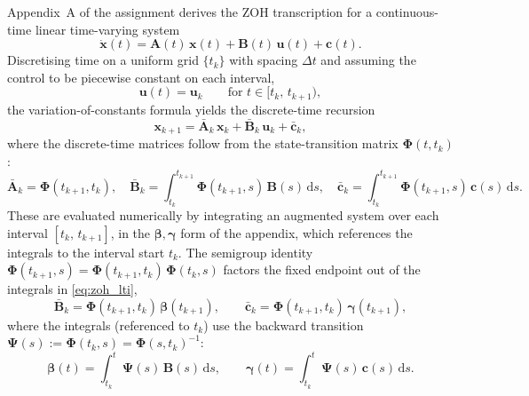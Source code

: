 \documentclass[../main.tex]{subfiles}
\begin{document}
Appendix~A of the assignment derives the ZOH transcription for a continuous-time linear time-varying system
\begin{equation}
    \dot{\mathbf{x}}(t) = \mathbf{A}(t)\,\mathbf{x}(t) + \mathbf{B}(t)\,\mathbf{u}(t) + \mathbf{c}(t).
    \label{eq:ltv_sys}
\end{equation}
Discretising time on a uniform grid $\{t_k\}$ with spacing $\Delta t$ and assuming the control to be piecewise constant on each interval,
\begin{equation}
    \mathbf{u}(t) = \mathbf{u}_k \qquad \text{for } t \in [t_k,\, t_{k+1}),
\end{equation}
the variation-of-constants formula yields the discrete-time recursion
\begin{equation}
    \mathbf{x}_{k+1} = \bar{\mathbf{A}}_k\,\mathbf{x}_k + \bar{\mathbf{B}}_k\,\mathbf{u}_k + \bar{\mathbf{c}}_k,
    \label{eq:zoh_lti}
\end{equation}
where the discrete-time matrices follow from the state-transition matrix $\boldsymbol{\Phi}(t,t_k)$:
\begin{equation}
    \bar{\mathbf{A}}_k = \boldsymbol{\Phi}(t_{k+1},t_k),\quad
    \bar{\mathbf{B}}_k = \int_{t_k}^{t_{k+1}}\!\boldsymbol{\Phi}(t_{k+1},s)\,\mathbf{B}(s)\,\mathrm{d}s,\quad
    \bar{\mathbf{c}}_k = \int_{t_k}^{t_{k+1}}\!\boldsymbol{\Phi}(t_{k+1},s)\,\mathbf{c}(s)\,\mathrm{d}s.
\end{equation}
These are evaluated numerically by integrating an augmented system over each interval $[t_k,\,t_{k+1}]$, in the $\boldsymbol{\beta},\boldsymbol{\gamma}$ form of the appendix, which references the integrals to the interval start $t_k$. The semigroup identity $\boldsymbol{\Phi}(t_{k+1},s) = \boldsymbol{\Phi}(t_{k+1},t_k)\,\boldsymbol{\Phi}(t_k,s)$ factors the fixed endpoint out of the integrals in \eqref{eq:zoh_lti},
\begin{equation}
    \bar{\mathbf{B}}_k = \boldsymbol{\Phi}(t_{k+1},t_k)\,\boldsymbol{\beta}(t_{k+1}),\qquad
    \bar{\mathbf{c}}_k = \boldsymbol{\Phi}(t_{k+1},t_k)\,\boldsymbol{\gamma}(t_{k+1}),
\end{equation}
where the integrals (referenced to $t_k$) use the backward transition $\boldsymbol{\Psi}(s) := \boldsymbol{\Phi}(t_k,s) = \boldsymbol{\Phi}(s,t_k)^{-1}$:
\begin{equation}
    \boldsymbol{\beta}(t) = \int_{t_k}^{t}\!\boldsymbol{\Psi}(s)\,\mathbf{B}(s)\,\mathrm{d}s,\qquad
    \boldsymbol{\gamma}(t) = \int_{t_k}^{t}\!\boldsymbol{\Psi}(s)\,\mathbf{c}(s)\,\mathrm{d}s.
\end{equation}
\end{document}
